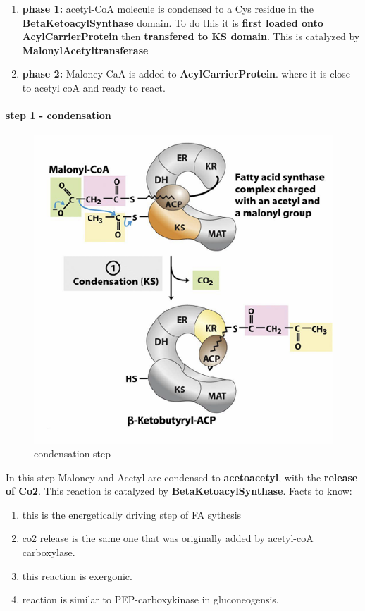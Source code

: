 \documentclass[../main.tex]{subfiles}
\begin{document}
\begin{enumerate}
    \item \textbf{phase 1:} acetyl-CoA  molecule is 
    condensed to a Cys residue in the \textbf{\gls{BetaKetoacylSynthase}} domain. To do this it is\textbf{ first loaded onto \gls{AcylCarrierProtein}} then \textbf{transfered to KS domain}. This is catalyzed by \textbf{\gls{MalonylAcetyltransferase}}

    \item \textbf{phase 2:} Maloney-CaA is added to \textbf{\gls{AcylCarrierProtein}}. where it is close to acetyl coA and ready to react.
\end{enumerate}


\paragraph{step 1 - condensation}
\begin{figure}[H]
    \centering
    \includegraphics[width=0.5\linewidth]{condensation.png}
    \caption{condensation step}
    \label{fig:enter-label}
\end{figure}

In this step Maloney and Acetyl are condensed to \textbf{\gls{acetoacetyl}}, with the \textbf{release of Co2}. This reaction is catalyzed by \textbf{\gls{BetaKetoacylSynthase}}. Facts to know:
\begin{enumerate}
    \item this is the energetically driving step of FA sythesis
    \item co2 release is the same one that was originally added by acetyl-coA carboxylase.
    \item this reaction is exergonic.
    \item reaction is similar to  PEP-carboxykinase in gluconeogensis.
\end{enumerate}
\end{document}
